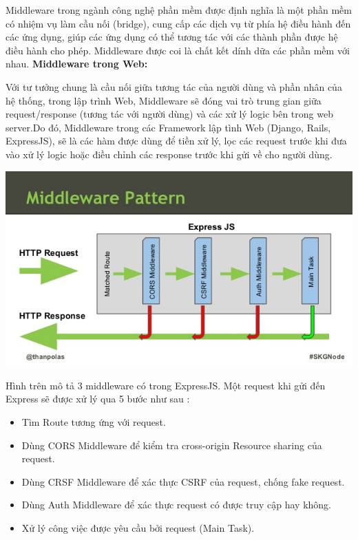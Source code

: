
Middleware trong ngành công nghệ phần mềm được định nghĩa là một phần mềm có nhiệm vụ làm cầu nối (bridge), cung cấp các dịch vụ từ phía hệ điều hành đến các ứng dụng, giúp các ứng dụng có thể tương tác với các thành phần được hệ điều hành cho phép. Middleware được coi là chất kết dính dữa các phần mềm với nhau.
\textbf{Middleware trong Web:} 

Với tư tưởng chung là cầu nối giữa tương tác của người dùng và phần nhân của hệ thống, trong lập trình Web, Middleware sẽ đóng vai trò trung gian giữa request/response (tương tác với người dùng) và các xử lý logic bên trong web server.Do đó, Middleware trong các Framework lập tình Web (Django, Rails, ExpressJS), sẽ là các hàm được dùng để tiền xử lý, lọc các request trước khi đưa vào xử lý logic hoặc điều chỉnh các response trước khi gửi về cho người dùng.

\begin{center}
  \captionsetup{type=figure}
  \includegraphics[width=15cm]{img/expressjsmiddleware.jpg}
\end{center}

Hình trên mô tả 3 middleware có trong ExpressJS. Một request khi gửi đến Express sẽ được xử lý qua 5 bước như sau :
\begin{itemize}
  \item Tìm Route tương ứng với request.
  \item Dùng CORS Middleware để kiểm tra cross-origin Resource sharing của request.
  \item Dùng CRSF Middleware để xác thực CSRF của request, chống fake request.
  \item Dùng Auth Middleware để xác thực request có được truy cập hay không.
  \item Xử lý công việc được yêu cầu bởi request (Main Task).
\end{itemize}

